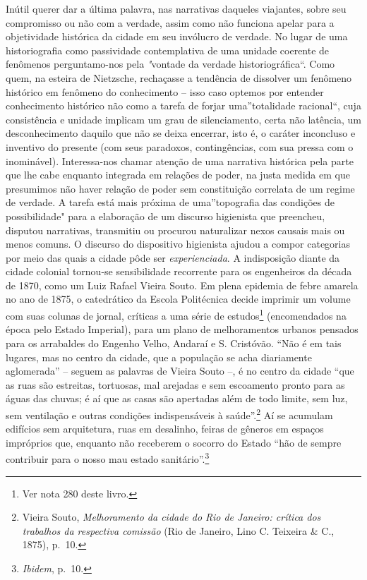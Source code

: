 Inútil querer dar a última palavra, nas narrativas daqueles viajantes,
sobre seu compromisso ou não com a verdade, assim como não funciona
apelar para a objetividade histórica da cidade em seu invólucro de
verdade. No lugar de uma historiografia como passividade contemplativa
de uma unidade coerente de fenômenos perguntamo-nos pela \emph{"}vontade
da verdade historiográfica``. Como quem, na esteira de Nietzsche,
rechaçasse a tendência de dissolver um fenômeno histórico em fenômeno do
conhecimento -- isso caso optemos por entender conhecimento histórico
não como a tarefa de forjar uma''totalidade racional``, cuja
consistência e unidade implicam um grau de silenciamento, certa não
latência, um desconhecimento daquilo que não se deixa encerrar, isto é,
o caráter inconcluso e inventivo do presente (com seus paradoxos,
contingências, com sua pressa com o inominável). Interessa-nos chamar
atenção de uma narrativa histórica pela parte que lhe cabe enquanto
integrada em relações de poder, na justa medida em que presumimos não
haver relação de poder sem constituição correlata de um regime de
verdade. A tarefa está mais próxima de uma''topografia das condições de
possibilidade" para a elaboração de um discurso higienista que
preencheu, disputou narrativas, transmitiu ou procurou naturalizar nexos
causais mais ou menos comuns. O discurso do dispositivo higienista
ajudou a compor categorias por meio das quais a cidade pôde ser
\emph{experienciada}. A indisposição diante da cidade colonial tornou-se
sensibilidade recorrente para os engenheiros da década de 1870, como um
Luiz Rafael Vieira Souto. Em plena epidemia de febre amarela no ano de
1875, o catedrático da Escola Politécnica decide imprimir um volume com
suas colunas de jornal, críticas a uma série de estudos\footnote{Ver
  nota 280 deste livro.} (encomendados na época pelo Estado Imperial),
para um plano de melhoramentos urbanos pensados para os arrabaldes do
Engenho Velho, Andaraí e S. Cristóvão. ``Não é em tais lugares, mas no
centro da cidade, que a população se acha diariamente aglomerada'' --
seguem as palavras de Vieira Souto --, é no centro da cidade ``que as
ruas são estreitas, tortuosas, mal arejadas e sem escoamento pronto para
as águas das chuvas; é aí que as casas são apertadas além de todo
limite, sem luz, sem ventilação e outras condições indispensáveis à
saúde''.\footnote{Vieira Souto, \emph{Melhoramento da cidade do Rio de
  Janeiro: crítica dos trabalhos da respectiva comissão} (Rio de
  Janeiro, Lino C. Teixeira \& C., 1875), p.~10.} Aí se acumulam
edifícios sem arquitetura, ruas em desalinho, feiras de gêneros em
espaços impróprios que, enquanto não receberem o socorro do Estado ``hão
de sempre contribuir para o nosso mau estado sanitário''.\footnote{\emph{Ibidem},
  p.~10.}

